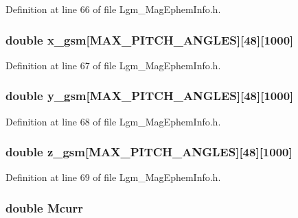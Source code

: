 Definition at line 66 of file Lgm\_\-MagEphemInfo.h.\hypertarget{struct_lgm___mag_ephem_info_59fdcbbc8f28e0dca963bdd893643827}{
\subsubsection[{x\_\-gsm}]{\setlength{\rightskip}{0pt plus 5cm}double {\bf x\_\-gsm}\mbox{[}MAX\_\-PITCH\_\-ANGLES\mbox{]}\mbox{[}48\mbox{]}\mbox{[}1000\mbox{]}}}
\label{struct_lgm___mag_ephem_info_59fdcbbc8f28e0dca963bdd893643827}




Definition at line 67 of file Lgm\_\-MagEphemInfo.h.\hypertarget{struct_lgm___mag_ephem_info_2f086d0ae7b5e1afb9e95b5194ea3d84}{
\subsubsection[{y\_\-gsm}]{\setlength{\rightskip}{0pt plus 5cm}double {\bf y\_\-gsm}\mbox{[}MAX\_\-PITCH\_\-ANGLES\mbox{]}\mbox{[}48\mbox{]}\mbox{[}1000\mbox{]}}}
\label{struct_lgm___mag_ephem_info_2f086d0ae7b5e1afb9e95b5194ea3d84}




Definition at line 68 of file Lgm\_\-MagEphemInfo.h.\hypertarget{struct_lgm___mag_ephem_info_604bb35325e4cdfd52be2d5d96fedc49}{
\subsubsection[{z\_\-gsm}]{\setlength{\rightskip}{0pt plus 5cm}double {\bf z\_\-gsm}\mbox{[}MAX\_\-PITCH\_\-ANGLES\mbox{]}\mbox{[}48\mbox{]}\mbox{[}1000\mbox{]}}}
\label{struct_lgm___mag_ephem_info_604bb35325e4cdfd52be2d5d96fedc49}




Definition at line 69 of file Lgm\_\-MagEphemInfo.h.\hypertarget{struct_lgm___mag_ephem_info_a63b377115bfe79515e2097f32738f8b}{
\subsubsection[{Mcurr}]{\setlength{\rightskip}{0pt plus 5cm}double {\bf Mcurr}}}
\label{struct_lgm___mag_ephem_info_a63b377115bfe79515e2097f32738f8b}




